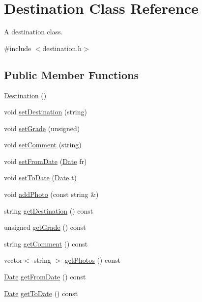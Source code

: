 \hypertarget{class_destination}{}\section{Destination Class Reference}
\label{class_destination}


A destination class.  




{\ttfamily \#include $<$destination.\+h$>$}

\subsection*{Public Member Functions}
\begin{DoxyCompactItemize}
\item 
\hyperlink{class_destination_ac23f3307b89ac7a8fa8aa8d4ff3e22a6}{Destination} ()
\item 
void \hyperlink{class_destination_a9cafaaf83be9ea548401caf2a2c4d839}{set\+Destination} (string)
\item 
void \hyperlink{class_destination_ac7f1c3be54b5223aa1e9ad4523ef6976}{set\+Grade} (unsigned)
\item 
void \hyperlink{class_destination_a08199ade6e0bf7488d796d85dec8cfd9}{set\+Comment} (string)
\item 
void \hyperlink{class_destination_a6fc539f51a5fd6844fef290facc4e887}{set\+From\+Date} (\hyperlink{class_date}{Date} fr)
\item 
void \hyperlink{class_destination_afec038764d48882a9005cea50e418219}{set\+To\+Date} (\hyperlink{class_date}{Date} t)
\item 
void \hyperlink{class_destination_a6494a9eae34083fd09861ba8f6923e92}{add\+Photo} (const string \&)
\item 
string \hyperlink{class_destination_a6544fb0fa820f5a6b914a38cdcc949f9}{get\+Destination} () const
\item 
unsigned \hyperlink{class_destination_a34dd7a2072743078d5067d336dc3c25d}{get\+Grade} () const
\item 
string \hyperlink{class_destination_a4d20ef4e561fa10dd81561b9cd61c55c}{get\+Comment} () const
\item 
vector$<$ string $>$ \hyperlink{class_destination_ade746815624a6fd5add31a3475e04b45}{get\+Photos} () const
\item 
\hyperlink{class_date}{Date} \hyperlink{class_destination_ac6265579620a20899f5e4cf817d037c8}{get\+From\+Date} () const
\item 
\hyperlink{class_date}{Date} \hyperlink{class_destination_a6a98c7e1c0ffa4b821d3f7dd85cad3dd}{get\+To\+Date} () const
\end{DoxyCompactItemize}


